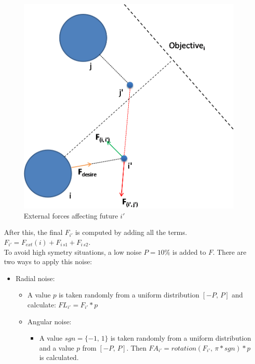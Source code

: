 \documentclass[draftclsnofoot]{IEEEtran}
\begin{document}
\begin{itemize}
\begin{itemize}
    \begin{figure}[!ht]
        \centering{}
        \includegraphics[scale=0.4]{pics/pedestrian-top-forces}
        \caption{\label{fig:External-forces-affecting}External forces affecting future $i'$}
    \end{figure}

\end{itemize}

After this, the final $F_{i'}$ is computed by adding all the terms.
$F_{i'}=F_{ext}(i)+F_{i\, s1}+F_{i\, s2}$.\\



To avoid high symetry situations, a low noise $P=10\%$ is added to
$F$. There are two ways to apply this noise: 
\begin{itemize}
\item Radial noise:

\begin{itemize}
\item A value $p$ is taken randomly from a uniform distribution $[-P,\, P]$
and calculate: $FL_{i'}=F_{i'}*p$ 
\item Angular noise:

\begin{itemize}
\item A value $sgn=\{-1,\,1\}$ is taken randomly from a uniform distribution
and a value $p$ from $[-P,\, P]$. Then $FA_{i'}=rotation(F_{i'},\,\pi*sgn)*p$
is calculated. 
\end{itemize}
\end{itemize}


\end{itemize}
\end{itemize}
\end{document}
